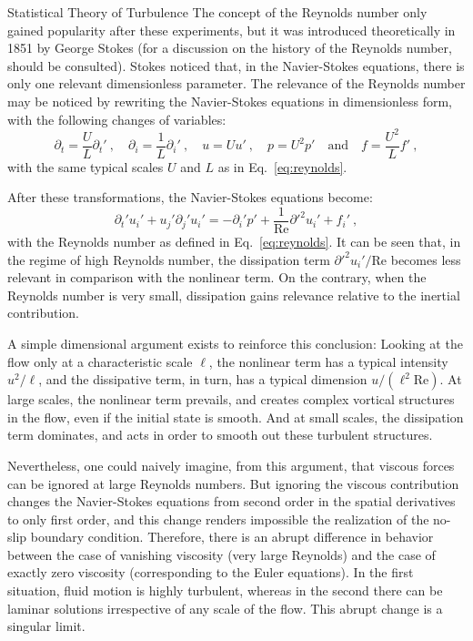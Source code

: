 \begin{chapter}{Statistical Theory of Turbulence}
The concept of the Reynolds number only gained popularity after these experiments, but it was introduced theoretically in 1851 by George Stokes (for a discussion on the history of the Reynolds
number, \textcite{rott1990note} should be consulted).
Stokes noticed that, in the Navier-Stokes equations, there is only one relevant dimensionless parameter.
The relevance of the Reynolds number may be noticed by rewriting the
Navier-Stokes equations in dimensionless form, with
the following changes of variables:
\begin{equation}
    \partial_t = \frac{U}{L} \partial_{t}' \ , \quad
    \partial_i = \frac1L \partial_{i}' \ , \quad
    u = U u' \ , \quad
    p = U^2 p' \quad \mbox{and} \quad
    f = \frac{U^2}{L} f' \ ,
\end{equation}
with the same typical scales $U$ and $L$
as in Eq.~\eqref{eq:reynolds}.

After these transformations, the Navier-Stokes equations become:
\begin{equation}
    \partial_t' u_i' + u_j' \partial_j' u_i' =
    - \partial_i' p' + \frac{1}{\mathrm{Re}} \partial'^2 u_i' + f_i' \ ,
\end{equation}
with the Reynolds number as defined in Eq.~\eqref{eq:reynolds}.
It can be seen that, in the regime of high Reynolds number, the dissipation term $\partial'^2 u_i' / \mathrm{Re}$ becomes less relevant in comparison with the nonlinear term.
On the contrary, when the Reynolds number is very small, dissipation gains relevance relative to the inertial contribution.

A simple dimensional argument exists to reinforce this conclusion: Looking at the flow only at a characteristic scale $\ell$, the nonlinear term has a typical intensity $u^2 /\ell$, and the dissipative term, in turn, has a typical dimension $u / (\ell^2 \mbox{Re})$. At large scales, the nonlinear term prevails, and creates complex vortical structures in the flow, even if the initial state is smooth. And at small scales, the dissipation term dominates, and acts in order to smooth out these turbulent structures.

Nevertheless, one could naively imagine, from this argument, that viscous forces can be ignored at large Reynolds numbers.
But ignoring the viscous contribution changes the Navier-Stokes equations from second order in the spatial derivatives to only first order, and this change renders impossible the realization of the no-slip boundary condition.
Therefore, there is an abrupt difference in behavior between the case of vanishing viscosity (very large Reynolds) and the case of exactly zero viscosity (corresponding to the Euler equations). In the first situation, fluid motion is highly turbulent, whereas in the second there can be laminar solutions irrespective of any scale of the flow.
This abrupt change is a singular limit.


\end{chapter}
